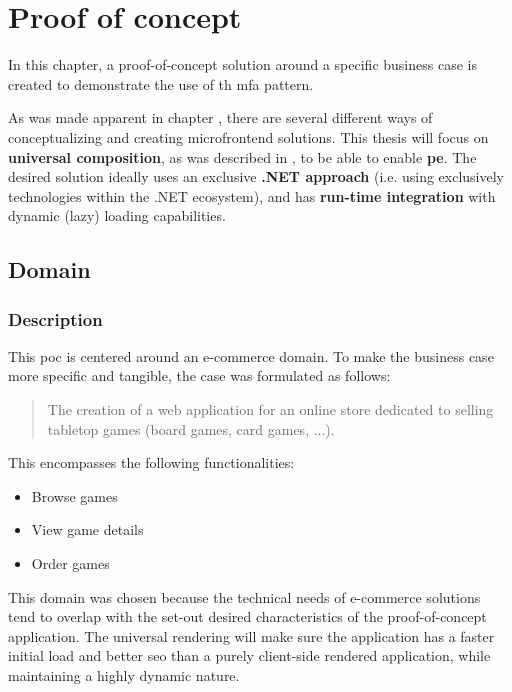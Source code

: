 
\chapter{Proof of concept}
\label{ch:proof-of-concept}

In this chapter, a proof-of-concept solution around a specific business case is
created to demonstrate the use of th \gls{mfa} pattern.

As was made apparent in chapter , there are several
different ways of conceptualizing and creating \gls{microfrontend} solutions.
This thesis will focus on \textbf{universal composition}, as was described in
, to be able to enable \textbf{\gls{pe}}.
The desired solution ideally uses an exclusive \textbf{.NET approach} (i.e.
using exclusively technologies within the .NET ecosystem), and has
\textbf{run-time integration} with dynamic (lazy) loading capabilities.


\section{Domain}
\subsection{Description}

This \gls{poc} is centered around an e-commerce domain. To make the
business case more specific and tangible, the case was formulated as
follows:

\begin{quote}
  The creation of a web application for an online store dedicated to selling
  tabletop games (board games, card games, ...).
\end{quote}

This encompasses the following functionalities:
\begin{itemize}
  \item Browse games
  \item View game details
  \item Order games
\end{itemize}

This domain was chosen because the technical needs of e-commerce solutions tend
to overlap with the set-out desired characteristics of the proof-of-concept
application. The universal rendering will make sure the application has a faster
initial load and better \gls{seo} than a purely client-side rendered
application, while maintaining a highly dynamic nature.

